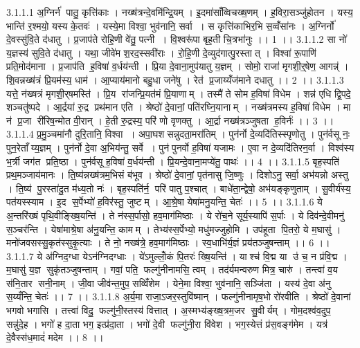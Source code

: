 3.1.1.1
अ॒ग्निर्न॑ पातु॒ कृत्ति॑काः । नख्ष॑त्रन्दे॒वमि॑न्द्रि॒यम् । इ॒दमा॑साँव्विचख्ष॒णम् । ह॒विरा॒सञ्जु॑होतन । यस्य॒ भान्ति॑ र॒श्मयो॒ यस्य के॒तवः॑ । यस्ये॒मा विश्वा॒ भुव॑नानि॒ सर्वा । स कृत्ति॑काभिर॒भि स॒व्वँसा॑नः । अ॒ग्निर्नो॑ दे॒वस्सु॑वि॒ते द॑धातु । प्र॒जाप॑ते रोहि॒णी वे॑तु॒ पत्नी । वि॒श्वरू॑पा बृह॒ती चि॒त्रभा॑नुः ।। 1 ।।
3.1.1.2
सा नो॑ य॒ज्ञस्य॑ सुवि॒ते द॑धातु । यथा॒ जीवे॑म श॒रद॒स्सवी॑राः । रो॒हि॒णी दे॒व्युद॑गात्पु॒रस्तात् । विश्वा॑ रू॒पाणि॑ प्रति॒मोद॑माना । प्र॒जाप॑ति ह॒विषा॑ व॒र्धय॑न्ती । प्रि॒या दे॒वाना॒मुप॑यातु य॒ज्ञम् । सोमो॒ राजा॑ मृगशी॒र्॒षेण॒ आगन्न्॑ । शि॒वन्नख्ष॑त्रं प्रि॒यम॑स्य॒ धाम॑ । आ॒प्याय॑मानो बहु॒धा जने॑षु । रेत॑ प्र॒जाय्यँज॑माने दधातु ।। 2 ।।
3.1.1.3
यत्ते॒ न॑ख्षत्रं मृगशी॒र्‌षमस्ति॑ । प्रि॒य रा॑जन्प्रि॒यत॑मं प्रि॒याणाम् । तस्मै॑ ते सोम ह॒विषा॑ विधेम । शन्न॑ एधि द्वि॒पदे॒ शञ्चतु॑ष्पदे । आ॒र्द्रया॑ रु॒द्र प्रथ॑मान एति । श्रेष्ठो॑ दे॒वानां॒ पति॑रघ्नि॒यानाम् । नख्ष॑त्रमस्य ह॒विषा॑ विधेम । मा न॑ प्र॒जा री॑रिष॒न्मोत वी॒रान् । हे॒ती रु॒द्रस्य॒ परि॑ णो वृणक्तु । आ॒र्द्रा नख्ष॑त्रञ्जुषता ह॒विर्नः॑ ।। 3 ।।
3.1.1.4
प्र॒मु॒ञ्चमा॑नौ दुरि॒तानि॒ विश्वा । अपा॒घश॑सन्नुदता॒मरा॑तिम् । पुन॑र्नो दे॒व्यदि॑तिस्स्पृणोतु । पुन॑र्वसू नः॒ पुन॒रेताँय्य॒ज्ञम् । पुन॑र्नो दे॒वा अ॒भिय॑न्तु॒ सर्वे । पुन॑पुनर्वो ह॒विषा॑ यजामः । ए॒वा न दे॒व्यदि॑तिरन॒र्वा । विश्व॑स्य भ॒र्त्री जग॑त प्रति॒ष्ठा । पुन॑र्वसू ह॒विषा॑ व॒र्धय॑न्ती । प्रि॒यन्दे॒वाना॒मप्ये॑तु॒ पाथः॑ ।। 4 ।।
3.1.1.5
बृह॒स्पति॑ प्रथ॒मञ्जाय॑मानः । ति॒ष्य॑न्नख्ष॑त्रम॒भिसं ब॑भूव । श्रेष्ठो॑ दे॒वानां॒ पृत॑नासु जि॒ष्णुः । दिशोऽनु॒ सर्वा॒ अभ॑यन्नो अस्तु । ति॒ष्य॑ पु॒रस्ता॑दु॒त म॑ध्य॒तो नः॑ । बृह॒स्पति॑र्न॒ परि॑ पातु प॒श्चात् । बाधे॑ता॒न्द्वेषो॒ अभ॑यङ्कृणुताम् । सु॒वीर्य॑स्य॒ पत॑यस्स्याम । इ॒द स॒र्पेभ्यो॑ ह॒विर॑स्तु॒ जुष्टम् । आ॒श्रे॒षा येषा॑मनु॒यन्ति॒ चेतः॑ ।। 5 ।।
3.1.1.6
ये अ॒न्तरि॑ख्षं पृथि॒वीङ्ख्षि॒यन्ति॑ । ते न॑स्स॒र्पासो॒ हव॒माग॑मिष्ठाः । ये रो॑च॒ने सूर्य॒स्यापि॑ स॒र्पाः । ये दिव॑न्दे॒वीमनु॑ स॒ञ्चर॑न्ति । येषा॑माश्रे॒षा अ॑नु॒यन्ति॒ कामम् । तेभ्य॑स्स॒र्पेभ्यो॒ मधु॑मज्जुहोमि । उप॑हूता पि॒तरो॒ ये म॒घासु॑ । मनो॑जवसस्सु॒कृत॑स्सुकृ॒त्याः । ते नो॒ नख्ष॑त्रे॒ हव॒माग॑मिष्ठाः । स्व॒धाभि॑र्य॒ज्ञं प्रय॑तञ्जुषन्ताम् ।। 6 ।।
3.1.1.7
ये अ॑ग्निद॒ग्धा येऽन॑ग्निदग्धाः । ये॑ऽमुल्लोँ॒कं पि॒तरः॑ ख्षि॒यन्ति॑ । याश्च॑ वि॒द्म या उ॑ च॒ न प्र॑वि॒द्म । म॒घासु॑ य॒ज्ञ सुकृ॑तञ्जुषन्ताम् । गवां॒ पति॒ फल्गु॑नीनामसि॒ त्वम् । तद॑र्यमन्वरुण मित्र॒ चारु॑ । तन्त्वा॑ व॒य स॑नि॒तार॑ सनी॒नाम् । जी॒वा जीव॑न्त॒मुप॒ सव्विँ॑शेम । येने॒मा विश्वा॒ भुव॑नानि॒ सञ्जि॑ता । यस्य॑ दे॒वा अ॑नु स॒य्यँन्ति॒ चेतः॑ ।। 7 ।।
3.1.1.8
अ॒र्य॒मा राजा॒ऽजर॒स्तुवि॑ष्मान् । फल्गु॑नीनामृष॒भो रो॑रवीति । श्रेष्ठो॑ दे॒वानां भगवो भगासि । तत्त्वा॑ विदु॒ फल्गु॑नी॒स्तस्य॑ वित्तात् । अ॒स्मभ्य॑ङ्ख्ष॒त्रम॒जर॑ सु॒वीर्यम् । गोम॒दश्व॑व॒दुप॒ सन्नु॑दे॒ह । भगो॑ ह दा॒ता भग॒ इत्प्र॑दा॒ता । भगो॑ दे॒वी फल्गु॑नी॒रा वि॑वेश । भग॒स्येत्तं प्र॑स॒वङ्ग॑मेम । यत्र॑ दे॒वैस्स॑ध॒मादं॑ मदेम ।। 8 ।।
